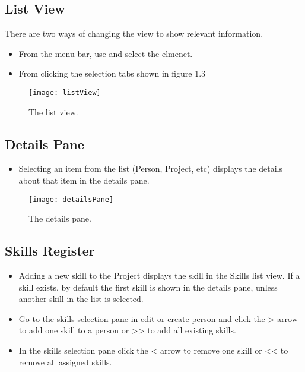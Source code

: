 \documentclass[11pt,fleqn]{book} %
\begin{document}
\pagebreak

\subsection{List View}
There are two ways of changing the view to show relevant information.
\begin{itemize}
  \item From the menu bar, use  and select the elmenet. 
  \item From clicking the selection tabs shown in figure 1.3
\end{itemize}

\begin{figure}[H]
  \centering
  \texttt{[image: listView]}
  \caption{The list view.\label{listView}}
\end{figure}

\subsection{Details Pane}
\begin{itemize}
  \item Selecting an item from the list (Person, Project, etc) displays the details about that item in the details pane.
\end{itemize}

\begin{figure}[H]
  \centering
  \texttt{[image: detailsPane]}
  \caption{The details pane.\label{detailsPane}}
\end{figure}

\pagebreak

\subsection{Skills Register}
\begin{itemize}
  \item Adding a new skill to the Project displays the skill in the Skills list view. If a skill exists, by default the first skill is shown in the details pane, unless another skill in the list is selected. 
  \item Go to the skills selection pane in edit or create person and click the > arrow to add one skill to a person or >> to add all existing skills.
  \item In the skills selection pane click the < arrow to remove one skill or << to remove all assigned skills. 
\end{itemize}
\end{document}

